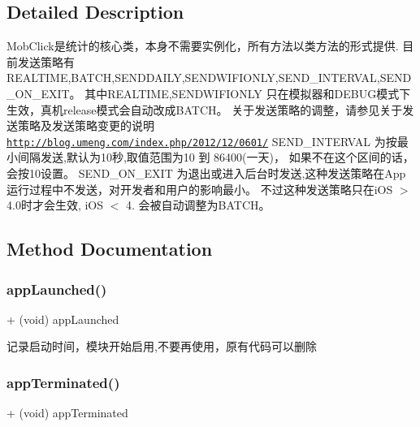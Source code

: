 \subsection{Detailed Description}
Mob\+Click是统计的核心类，本身不需要实例化，所有方法以类方法的形式提供. 目前发送策略有\+R\+E\+A\+L\+T\+I\+ME,B\+A\+T\+CH,S\+E\+N\+D\+D\+A\+I\+LY,S\+E\+N\+D\+W\+I\+F\+I\+O\+N\+LY,S\+E\+N\+D\+\_\+\+I\+N\+T\+E\+R\+V\+AL,S\+E\+N\+D\+\_\+\+O\+N\+\_\+\+E\+X\+I\+T。 其中\+R\+E\+A\+L\+T\+I\+ME,S\+E\+N\+D\+W\+I\+F\+I\+O\+N\+LY 只在模拟器和\+D\+E\+B\+U\+G模式下生效，真机release模式会自动改成\+B\+A\+T\+C\+H。 关于发送策略的调整，请参见关于发送策略及发送策略变更的说明 \href{http://blog.umeng.com/index.php/2012/12/0601/}{\tt http\+://blog.\+umeng.\+com/index.\+php/2012/12/0601/} S\+E\+N\+D\+\_\+\+I\+N\+T\+E\+R\+V\+AL 为按最小间隔发送,默认为10秒,取值范围为10 到 86400(一天)， 如果不在这个区间的话，会按10设置。 S\+E\+N\+D\+\_\+\+O\+N\+\_\+\+E\+X\+IT 为退出或进入后台时发送,这种发送策略在\+App运行过程中不发送，对开发者和用户的影响最小。 不过这种发送策略只在i\+OS $>$ 4.\+0时才会生效, i\+OS $<$ 4. 会被自动调整为\+B\+A\+T\+C\+H。 

\subsection{Method Documentation}
\mbox{\label{interfaceMobClick_a5173b1e6c774c7add2fac86a78290308}} 
\subsubsection{\texorpdfstring{app\+Launched()}{appLaunched()}}
{\footnotesize\ttfamily + (void) app\+Launched \begin{DoxyParamCaption}{ }\end{DoxyParamCaption}}

记录启动时间，模块开始启用,不要再使用，原有代码可以删除 \mbox{\label{interfaceMobClick_a29f8bb03081a087c827873118d7d807e}} 
\subsubsection{\texorpdfstring{app\+Terminated()}{appTerminated()}}
{\footnotesize\ttfamily + (void) app\+Terminated \begin{DoxyParamCaption}{ }\end{DoxyParamCaption}}

